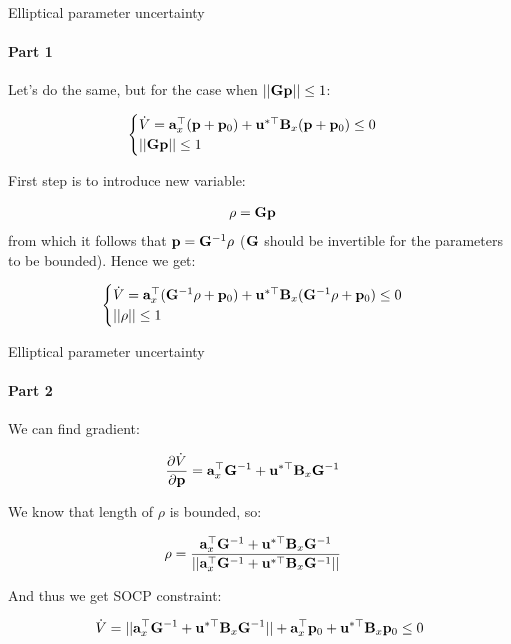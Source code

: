 \documentclass{beamer}
\begin{document}
\begin{frame}{Elliptical parameter uncertainty}
\framesubtitle{Part 1}
\begin{flushleft}

Let's do the same, but for the case when $||\mathbf{G}\mathbf{p}|| \leq 1$:

\begin{equation}
    \begin{cases}
\dot{V} = \mathbf{a}_x^\top (\mathbf{p} + \mathbf{p}_0) + 
\mathbf{u}^{*\top} \mathbf{B}_x (\mathbf{p} + \mathbf{p}_0) \leq 0 \\
||\mathbf{G}\mathbf{p}|| \leq 1
    \end{cases}
\end{equation}

First step is to introduce new variable:

\begin{align}
& \rho = \mathbf{G}\mathbf{p}
\end{align}
%
from which it follows that $\mathbf{p} = \mathbf{G}^{-1} \rho$ ($\mathbf{G}$ should be invertible for the parameters to be bounded). Hence we get:

\begin{equation}
    \begin{cases}
\dot{V} = \mathbf{a}_x^\top (\mathbf{G}^{-1} \rho + \mathbf{p}_0) + 
\mathbf{u}^{*\top} \mathbf{B}_x (\mathbf{G}^{-1} \rho + \mathbf{p}_0) \leq 0 \\
||\rho|| \leq 1
    \end{cases}
\end{equation}

\end{flushleft}
\end{frame}



\begin{frame}{Elliptical parameter uncertainty}
\framesubtitle{Part 2}
\begin{flushleft}

We can find gradient:

\begin{align}
& \frac{\partial \dot{V}}{\partial  \mathbf{p}}  = 
\mathbf{a}_x^\top \mathbf{G}^{-1}  + 
\mathbf{u}^{*\top} \mathbf{B}_x \mathbf{G}^{-1}
\end{align}

We know that length of $\rho$ is bounded, so:

\begin{align}
& \rho  = 
\frac{\mathbf{a}_x^\top \mathbf{G}^{-1}  + 
\mathbf{u}^{*\top} \mathbf{B}_x \mathbf{G}^{-1}}{|| \mathbf{a}_x^\top \mathbf{G}^{-1}  + 
\mathbf{u}^{*\top} \mathbf{B}_x \mathbf{G}^{-1} ||}
\end{align}

And thus we get SOCP constraint:

\begin{equation}
\dot{V} = 
|| \mathbf{a}_x^\top \mathbf{G}^{-1}  + 
\mathbf{u}^{*\top} \mathbf{B}_x \mathbf{G}^{-1} ||
+ 
\mathbf{a}_x^\top \mathbf{p}_0 + 
\mathbf{u}^{*\top} \mathbf{B}_x \mathbf{p}_0 \leq 0 
\end{equation}


\end{flushleft}
\end{frame}
\end{document}
